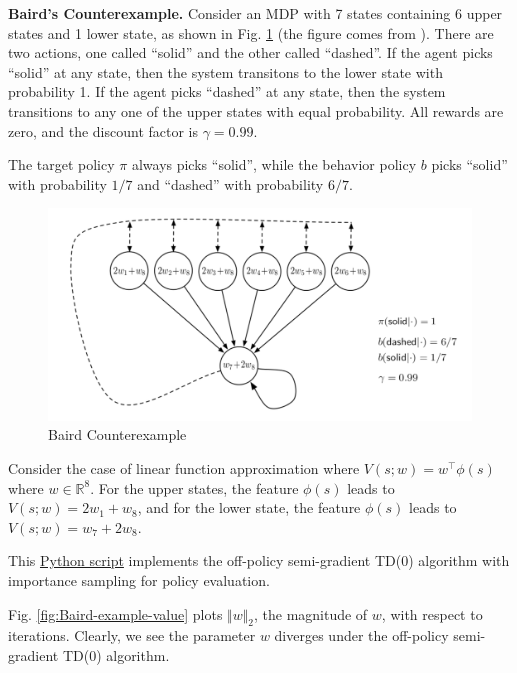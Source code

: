 \documentclass[
]{book}
\theoremstyle{definition}
\theoremstyle{definition}
\theoremstyle{definition}
\theoremstyle{definition}
\theoremstyle{remark}
\begin{document}
\textbf{Baird's Counterexample.} Consider an MDP with 7 states containing 6 upper states and 1 lower state, as shown in Fig. \ref{fig:Baird-example} (the figure comes from \citep{sutton1998reinforcement}). There are two actions, one called ``solid'' and the other called ``dashed''. If the agent picks ``solid'' at any state, then the system transitons to the lower state with probability 1. If the agent picks ``dashed'' at any state, then the system transitions to any one of the upper states with equal probability. All rewards are zero, and the discount factor is \(\gamma=0.99\).

The target policy \(\pi\) always picks ``solid'', while the behavior policy \(b\) picks ``solid'' with probability \(1/7\) and ``dashed'' with probability \(6/7\).

\begin{figure}

{\centering \includegraphics[width=0.7\linewidth]{images/Value-RL/Baird} 

}

\caption{Baird Counterexample}\label{fig:Baird-example}
\end{figure}

Consider the case of linear function approximation where \(V(s;w) = w^\top \phi(s)\) where \(w \in \mathbb{R}^8\). For the upper states, the feature \(\phi(s)\) leads to \(V(s;w) = 2 w_1 + w_8\), and for the lower state, the feature \(\phi(s)\) leads to \(V(s;w) = w_7 + 2w_8\).

This \href{https://github.com/ComputationalRobotics/2025-ES-AM-158-LECTURE-CODE/blob/main/BairdExample.py}{Python script} implements the off-policy semi-gradient TD(0) algorithm with importance sampling for policy evaluation.

Fig. \ref{fig:Baird-example-value} plots \(\Vert w \Vert_2\), the magnitude of \(w\), with respect to iterations. Clearly, we see the parameter \(w\) diverges under the off-policy semi-gradient TD(0) algorithm.
\end{document}
